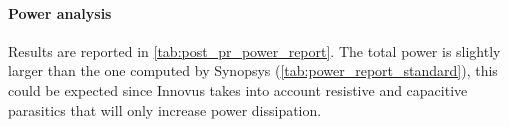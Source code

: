 \paragraph{Power analysis} Results are reported in \autoref{tab:post_pr_power_report}. The total power is slightly larger than the one computed by Synopsys (\autoref{tab:power_report_standard}), this could be expected since Innovus takes into account resistive and capacitive parasitics that will only increase power dissipation.


